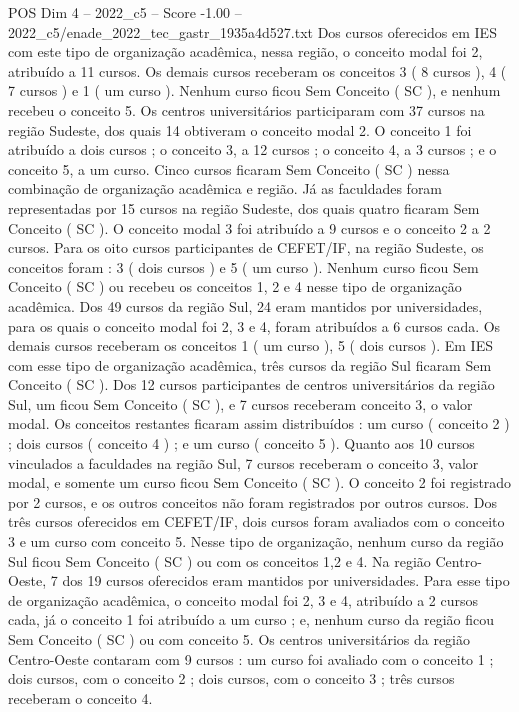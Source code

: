 \begin{textsample}{POS Dim 4 – 2022\_c5 – Score -1.00 – 2022\_c5/enade\_2022\_tec\_gastr\_1935a4d527.txt}
Dos cursos oferecidos em IES com este tipo de organização acadêmica, nessa região, o conceito modal foi 2, atribuído a 11 cursos.
Os demais cursos receberam os conceitos 3 ( 8 cursos ), 4 ( 7 cursos ) e 1 ( um curso ).
Nenhum curso ficou Sem Conceito ( SC ), e nenhum recebeu o conceito 5.
Os centros universitários participaram com 37 cursos na região Sudeste, dos quais 14 obtiveram o conceito modal 2.
O conceito 1 foi atribuído a dois cursos ; o conceito 3, a 12 cursos ; o conceito 4, a 3 cursos ; e o conceito 5, a um curso.
Cinco cursos ficaram Sem Conceito ( SC ) nessa combinação de organização acadêmica e região.
Já as faculdades foram representadas por 15 cursos na região Sudeste, dos quais quatro ficaram Sem Conceito ( SC ).
O conceito modal 3 foi atribuído a 9 cursos e o conceito 2 a 2 cursos.
Para os oito cursos participantes de CEFET/IF, na região Sudeste, os conceitos foram : 3 ( dois cursos ) e 5 ( um curso ).
Nenhum curso ficou Sem Conceito ( SC ) ou recebeu os conceitos 1, 2 e 4 nesse tipo de organização acadêmica.
Dos 49 cursos da região Sul, 24 eram mantidos por universidades, para os quais o conceito modal foi 2, 3 e 4, foram atribuídos a 6 cursos cada.
Os demais cursos receberam os conceitos 1 ( um curso ), 5 ( dois cursos ).
Em IES com esse tipo de organização acadêmica, três cursos da região Sul ficaram Sem Conceito ( SC ).
Dos 12 cursos participantes de centros universitários da região Sul, um ficou Sem Conceito ( SC ), e 7 cursos receberam conceito 3, o valor modal.
Os conceitos restantes ficaram assim distribuídos : um curso ( conceito 2 ) ; dois cursos ( conceito 4 ) ; e um curso ( conceito 5 ).
Quanto aos 10 cursos vinculados a faculdades na região Sul, 7 cursos receberam o conceito 3, valor modal, e somente um curso ficou Sem Conceito ( SC ).
O conceito 2 foi registrado por 2 cursos, e os outros conceitos não foram registrados por outros cursos.
Dos três cursos oferecidos em CEFET/IF, dois cursos foram avaliados com o conceito 3 e um curso com conceito 5.
Nesse tipo de organização, nenhum curso da região Sul ficou Sem Conceito ( SC ) ou com os conceitos 1,2 e 4.
Na região Centro-Oeste, 7 dos 19 cursos oferecidos eram mantidos por universidades.
Para esse tipo de organização acadêmica, o conceito modal foi 2, 3 e 4, atribuído a 2 cursos cada, já o conceito 1 foi atribuído a um curso ; e, nenhum curso da região ficou Sem Conceito ( SC ) ou com conceito 5.
Os centros universitários da região Centro-Oeste contaram com 9 cursos : um curso foi avaliado com o conceito 1 ; dois cursos, com o conceito 2 ; dois cursos, com o conceito 3 ; três cursos receberam o conceito 4.

\end{textsample}
